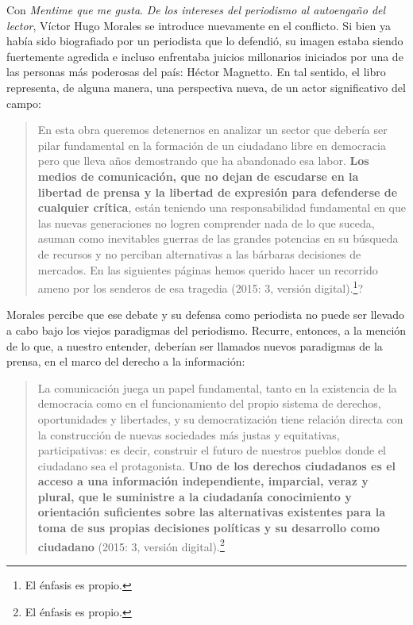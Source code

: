 Con \emph{Mentime que me gusta}. \emph{De los intereses del periodismo al autoengaño del lector}, Víctor Hugo Morales se introduce nuevamente en el conflicto. Si bien ya había sido biografiado por un periodista que lo defendió, su imagen estaba siendo fuertemente agredida e incluso enfrentaba juicios millonarios iniciados por una de las personas más poderosas del país: Héctor Magnetto. En tal sentido, el libro representa, de alguna manera, una perspectiva nueva, de un actor significativo del campo:

\begin{quote}
En esta obra queremos detenernos en analizar un sector que debería ser pilar fundamental en la formación de un ciudadano libre en democracia pero que lleva años demostrando que ha abandonado esa labor. \textbf{Los medios de comunicación, que no dejan de escudarse en la libertad de prensa y la libertad de expresión para defenderse de cualquier crítica}, están teniendo una responsabilidad fundamental en que las nuevas generaciones no logren comprender nada de lo que suceda, asuman como inevitables guerras de las grandes potencias en su búsqueda de recursos y no perciban alternativas a las bárbaras decisiones de mercados. En las siguientes páginas hemos querido hacer un recorrido ameno por los senderos de esa tragedia (2015: 3, versión digital).\footnote{El énfasis es propio.}?
\end{quote}

Morales percibe que ese debate y su defensa como periodista no puede ser llevado a cabo bajo los viejos paradigmas del periodismo. Recurre, entonces, a la mención de lo que, a nuestro entender, deberían ser llamados nuevos paradigmas de la prensa, en el marco del derecho a la información:

\begin{quote}
La comunicación juega un papel fundamental, tanto en la existencia de la democracia como en el funcionamiento del propio sistema de derechos, oportunidades y libertades, y su democratización tiene relación directa con la construcción de nuevas sociedades más justas y equitativas, participativas: es decir, construir el futuro de nuestros pueblos donde el ciudadano sea el protagonista. \textbf{Uno de los derechos ciudadanos es el acceso a una información independiente, imparcial, veraz y plural, que le suministre a la ciudadanía conocimiento y orientación suficientes sobre las alternativas existentes para la toma de sus propias decisiones políticas y su desarrollo como ciudadano} (2015: 3, versión digital).\footnote{El énfasis es propio.}
\end{quote}


